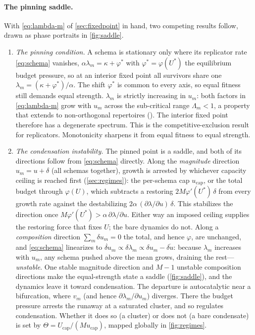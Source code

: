 \documentclass[
  aps,prx,
  reprint,
  superscriptaddress,
  nofootinbib,
  longbibliography
]{revtex4-2}
\newcommand{\smref}[1]{\cite[Sec.~#1]{SM}}
\begin{document}
\paragraph{The pinning saddle.} With \cref{eq:lambda-m} of \cref{sec:fixedpoint} in hand, two competing results follow, drawn as phase portraits in \cref{fig:saddle}.
\begin{enumerate}
\item\emph{The pinning condition.} A schema is stationary only where its replicator rate \cref{eq:schema} vanishes, $\alpha\lambda_m=\kappa+\varphi^\ast$ with $\varphi^\ast=\varphi(U^\ast)$ the equilibrium budget pressure, so at an interior fixed point all survivors share one $\lambda_m=(\kappa+\varphi^\ast)/\alpha$. The shift $\varphi^\ast$ is common to every axis, so equal fitness still demands equal strength. $\lambda_m$ is strictly increasing in $u_m$: both factors in \cref{eq:lambda-m} grow with $u_m$ across the sub-critical range $\Lambda_m<1$, a property that extends to non-orthogonal repertoires (\smref{S5}). The interior fixed point therefore has a degenerate spectrum. This is the competitive-exclusion result for replicators. Monotonicity sharpens it from equal fitness to equal strength.
\item \emph{The condensation instability.} The pinned point is a saddle, and both of its directions follow from \cref{eq:schema} directly. Along the \emph{magnitude} direction $u_m=u+\delta$ (all schemas together), growth is arrested by whichever capacity ceiling is reached first (\cref{sec:regimes}): the per-schema cap $u_{\mathrm{cap}}$, or the total budget through $\varphi(U)$, which subtracts a restoring $2M\varphi'(U^\ast)\,\delta$ from every growth rate against the destabilizing $2\alpha\,(\partial\lambda/\partial u)\,\delta$. This stabilizes the direction once $M\varphi'(U^\ast)>\alpha\,\partial\lambda/\partial u$. Either way an imposed ceiling supplies the restoring force that fixes $U$; the bare dynamics do not. Along a \emph{composition} direction $\sum_m\delta u_m=0$ the total, and hence $\varphi$, are unchanged, and \cref{eq:schema} linearizes to $\dot{\delta u}_m\propto\delta\lambda_m\propto\delta u_m-\overline{\delta u}$: because $\lambda_m$ increases with $u_m$, any schema pushed above the mean grows, draining the rest---\emph{unstable}. One stable magnitude direction and $M-1$ unstable composition directions make the equal-strength state a saddle (\cref{fig:saddle}), and the dynamics leave it toward condensation. The departure is autocatalytic near a bifurcation, where $v_m$ (and hence $\partial\lambda_m/\partial u_m$) diverges. There the budget pressure arrests the runaway at a saturated cluster, and so regulates condensation. Whether it does so (a cluster) or does not (a bare condensate) is set by $\Theta=U_{\mathrm{cap}}/(Mu_{\mathrm{cap}})$, mapped globally in \cref{fig:regimes}.
\end{enumerate}
\end{document}
